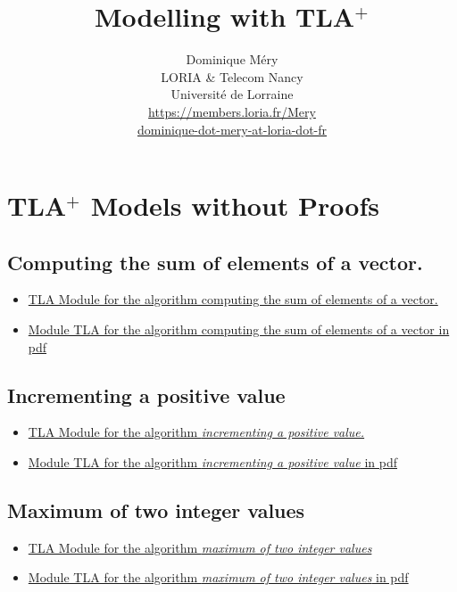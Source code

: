 \documentclass[ 12pt]{article}
\title{Modelling with TLA$^+$}
\author{Dominique M\'ery\\
LORIA \& Telecom Nancy\\ Universit\'e de Lorraine\\
\url{https://members.loria.fr/Mery}\\ \url{dominique-dot-mery-at-loria-dot-fr}}
\begin{document}
  \setcounter{ex}{1}
\maketitle



\section{TLA$^+$ Models without Proofs}
\label{sec:last-news}

\subsection{ Computing the sum of elements of a vector.}
\label{sec:comp-sum-elem}


\begin{itemize}
\item[] 
  \href{https://mery54.github.io/mery/tla/TLAPROOFVECTSUM.tla}{TLA Module 
    for the algorithm  computing the sum of elements of a vector.}
\item   \href{https://mery54.github.io/mery/tla/TLAPROOFVECTSUM.pdf}{Module 
    TLA for the algorithm  computing the sum of elements of a vector
    in pdf}
    
\end{itemize}



\subsection{Incrementing a positive value}
\label{sec:comp-sum-elem}


\begin{itemize}
\item[] 
  \href{https://mery54.github.io/mery/tla/TLAPROOFINC.tla}{TLA Module 
    for the algorithm \textit{ incrementing a positive value.}}
\item   \href{https://mery54.github.io/mery/tla/TLAPROOFINC.pdf}{Module 
    TLA for the algorithm  \textit{incrementing a positive value}
    in pdf}
    
\end{itemize}



\subsection{Maximum of two integer values}
\label{sec:comp-sum-elem}


\begin{itemize}
\item[] 
  \href{https://mery54.github.io/mery/tla/TLAPROOFMAX2.tla}{TLA Module 
    for the algorithm \textit{ maximum of two integer values}}
\item   \href{https://mery54.github.io/mery/tla/TLAPROOFMAX2.pdf}{Module 
    TLA for the algorithm  \textit{{maximum of two integer values}}
    in pdf}
    
\end{itemize}
\end{document}
